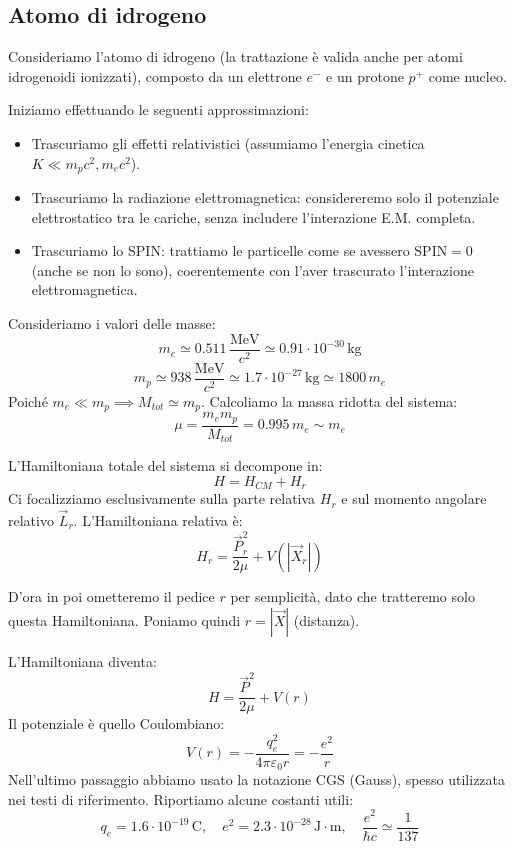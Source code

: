 \subsection{Atomo di idrogeno}

Consideriamo l'atomo di idrogeno (la trattazione è valida anche per atomi idrogenoidi ionizzati), composto da un elettrone \( e^- \) e un protone \( p^+ \) come nucleo.

Iniziamo effettuando le seguenti approssimazioni:
\begin{itemize}
    \item Trascuriamo gli effetti relativistici (assumiamo l'energia cinetica \( K \ll m_p c^2, m_e c^2 \)).
    \item Trascuriamo la radiazione elettromagnetica: considereremo solo il potenziale elettrostatico tra le cariche, senza includere l'interazione E.M. completa.
    \item Trascuriamo lo SPIN: trattiamo le particelle come se avessero \( \text{SPIN}=0 \) (anche se non lo sono), coerentemente con l'aver trascurato l'interazione elettromagnetica.
\end{itemize}

Consideriamo i valori delle masse:
\[
m_e \simeq 0.511 \, \frac{\text{MeV}}{c^2} \simeq 0.91 \cdot 10^{-30} \, \text{kg}
\]
\[
m_p \simeq 938 \, \frac{\text{MeV}}{c^2} \simeq 1.7 \cdot 10^{-27} \, \text{kg} \simeq 1800 \, m_e
\]
Poiché \( m_e \ll m_p \implies M_{tot} \simeq m_p \).
Calcoliamo la massa ridotta del sistema:
\[
\mu = \frac{m_e m_p}{M_{tot}} = 0.995 \, m_e \sim m_e
\]

L'Hamiltoniana totale del sistema si decompone in:
\[
H = H_{CM} + H_r
\]
Ci focalizziamo esclusivamente sulla parte relativa \( H_r \) e sul momento angolare relativo \( \vec{L}_r \).
L'Hamiltoniana relativa è:
\begin{equation}
    H_r = \frac{\vec{P}_r^2}{2\mu} + V(|\vec{X}_r|)
\end{equation}
\begin{attention}
    D'ora in poi ometteremo il pedice \( r \) per semplicità, dato che tratteremo solo questa Hamiltoniana. Poniamo quindi \( r = |\vec{X}| \) (distanza).
\end{attention}

L'Hamiltoniana diventa:
\[
H = \frac{\vec{P}^2}{2\mu} + V(r)
\]
Il potenziale è quello Coulombiano:
\begin{equation}
    V(r) = - \frac{q_e^2}{4\pi\varepsilon_0 r} = - \frac{e^2}{r}
\end{equation}
Nell'ultimo passaggio abbiamo usato la notazione CGS (Gauss), spesso utilizzata nei testi di riferimento.
Riportiamo alcune costanti utili:
\[
q_e = 1.6 \cdot 10^{-19} \, \text{C}, \quad e^2 = 2.3 \cdot 10^{-28} \, \text{J}\cdot\text{m}, \quad \frac{e^2}{\hbar c} \simeq \frac{1}{137}
\]

